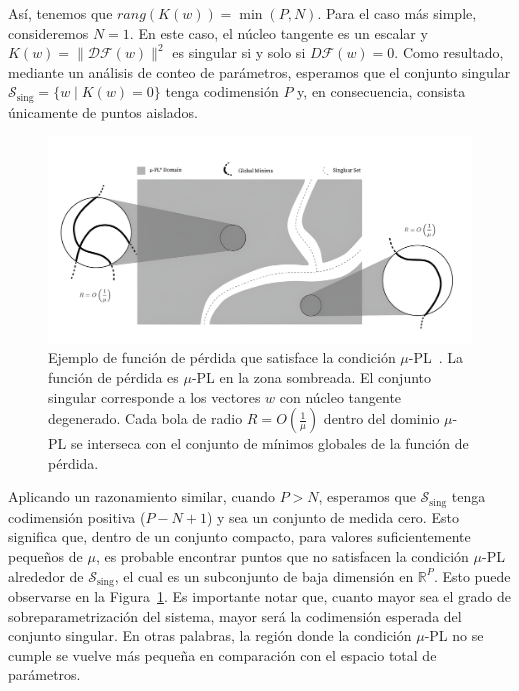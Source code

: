 Así, tenemos que $rang(K(w)) = \min(P, N)$. Para el caso más simple, consideremos $N = 1$. En este caso, el núcleo tangente es un escalar y $K(w) = \| \mathcal{DF}(w) \|^2$ es singular si y solo si $D\mathcal{F}(w) = 0$. Como resultado, mediante un análisis de conteo de parámetros, esperamos que el conjunto singular $\mathcal{S}_{\text{sing}} = \{ w \mid K(w) = 0 \}$ tenga codimensión $P$ y, en consecuencia, consista únicamente de puntos aislados.\newline

\begin{figure}[h]
    \centering
    \includegraphics[width=0.8\linewidth]{img/cosarara2.png}
    \caption[Ejemplo de función de pérdida que satisface la condición $\mu$-PL~\cite{Liu2021}.]{Ejemplo de función de pérdida que satisface la condición $\mu$-PL~\cite{Liu2021}. La función de pérdida es $\mu$-PL en la zona sombreada. El conjunto singular corresponde a los vectores $w$ con núcleo tangente degenerado. Cada bola de radio $R = O\left(\frac{1}{\mu}\right)$ dentro del dominio $\mu$-PL se interseca con el conjunto de mínimos globales de la función de pérdida.}\label{fig:cosarara2}
\end{figure}

Aplicando un razonamiento similar, cuando $P > N$, esperamos que $\mathcal{S}_{\text{sing}}$ tenga codimensión positiva ($P - N + 1$) y sea un conjunto de medida cero. Esto significa que, dentro de un conjunto compacto, para valores suficientemente pequeños de $\mu$, es probable encontrar puntos que no satisfacen la condición $\mu$-PL alrededor de $\mathcal{S}_{\text{sing}}$, el cual es un subconjunto de baja dimensión en $\mathbb{R}^P$. Esto puede observarse en la Figura~\ref{fig:cosarara2}. Es importante notar que, cuanto mayor sea el grado de sobreparametrización del sistema, mayor será la codimensión esperada del conjunto singular. En otras palabras, la región donde la condición $\mu$-PL no se cumple se vuelve más pequeña en comparación con el espacio total de parámetros.\newline

